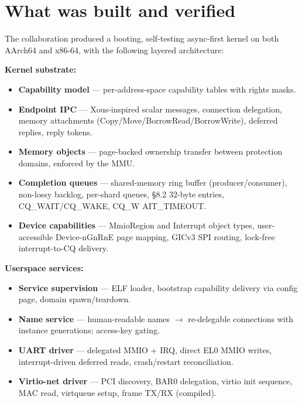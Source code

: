 \section{What was built and verified}

The collaboration produced a booting, self-testing async-first kernel on both
AArch64 and x86-64, with the following layered architecture:

\textbf{Kernel substrate:}
\begin{itemize}
    \item \textbf{Capability model} --- per-address-space capability tables with
        rights masks.
    \item \textbf{Endpoint IPC} --- Xous-inspired scalar messages, connection
        delegation, memory attachments (Copy/Move/BorrowRead/BorrowWrite),
        deferred replies, reply tokens.
    \item \textbf{Memory objects} --- page-backed ownership transfer between
        protection domains, enforced by the MMU.
    \item \textbf{Completion queues} --- shared-memory ring buffer
        (producer/consumer), non-lossy backlog, per-shard queues, \S8.2 32-byte
        entries, CQ\_WAIT/CQ\_WAKE, CQ\_W AIT\_TIMEOUT.
    \item \textbf{Device capabilities} --- MmioRegion and Interrupt object
        types, user-accessible Device-nGnRnE page mapping, GICv3 SPI routing,
        lock-free interrupt-to-CQ delivery.
\end{itemize}

\textbf{Userspace services:}
\begin{itemize}
    \item \textbf{Service supervision} --- ELF loader, bootstrap capability
        delivery via config page, domain spawn/teardown.
    \item \textbf{Name service} --- human-readable names $\rightarrow$
        re-delegable connections with instance generations; access-key gating.
    \item \textbf{UART driver} --- delegated MMIO + IRQ, direct EL0 MMIO writes,
        interrupt-driven deferred reads, crash/restart reconciliation.
    \item \textbf{Virtio-net driver} --- PCI discovery, BAR0 delegation, virtio
        init sequence, MAC read, virtqueue setup, frame TX/RX (compiled).
\end{itemize}

